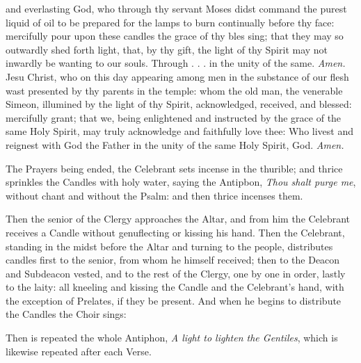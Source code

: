 {} and everlasting God, who through thy servant Moses didst command the purest liquid of oil to be prepared for the lamps to burn continually before thy face: mercifully pour upon these candles the grace of thy bles {} sing; that they may so outwardly shed forth light, that, by thy gift, the light of thy Spirit may not inwardly be wanting to our souls. Through . . . in the unity of the same. \textit{Amen.}
{} Jesu Christ, who on this day appearing among men in the substance of our flesh wast presented by thy parents in the temple: whom the old man, the venerable Simeon, illumined by the light of thy Spirit, acknowledged, received, and blessed: mercifully grant; that we, being enlightened and instructed by the grace of the same Holy Spirit, may truly acknowledge and faithfully love thee: Who livest and reignest with God the Father in the unity of the same Holy Spirit, God. \textit{Amen.}

\begin{rubric}
    The Prayers being ended, the Celebrant sets incense in the thurible; and thrice sprinkles the Candles with holy water, saying the Antipbon, \emph{Thou shalt purge me}, without chant and without the Psalm: and then thrice incenses them.
\end{rubric}
\begin{rubric}
    Then the senior of the Clergy approaches the Altar, and from him the Celebrant receives a Candle without genuflecting or kissing his hand. Then the Celebrant, standing in the midst before the Altar and turning to the people, distributes candles first to the senior, from whom he himself received; then to the Deacon and Subdeacon vested, and to the rest of the Clergy, one by one in order, lastly to the laity: all kneeling and kissing the Candle and the Celebrant's hand, with the exception of Prelates, if they be present. And when he begins to distribute the Candles the Choir sings:
\end{rubric}



\begin{rubric}
    Then is repeated the whole Antiphon, \emph{A light to lighten the Gentiles}, which is likewise repeated after each Verse.
\end{rubric}

